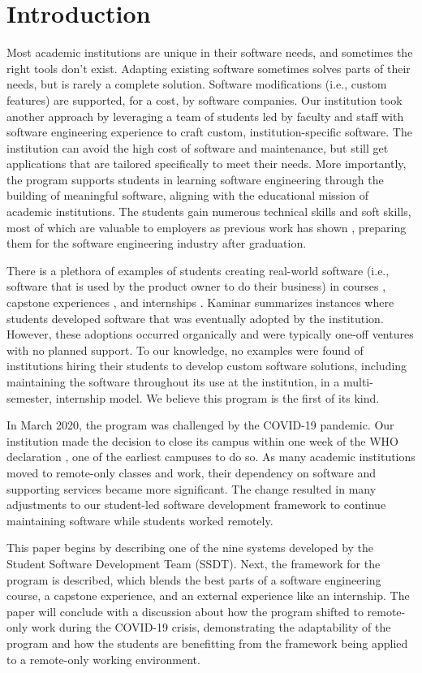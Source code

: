 \section{Introduction}

Most academic institutions are unique in their software needs, and sometimes the right tools don't exist. Adapting existing software sometimes solves parts of their needs, but is rarely a complete solution. Software modifications (i.e., custom features) are supported, for a cost, by software companies. Our institution took another approach by leveraging a team of students led by faculty and staff with software engineering experience to craft custom, institution-specific software. The institution can avoid the high cost of software and maintenance, but still get applications that are tailored specifically to meet their needs. More importantly, the program supports students in learning software engineering through the building of meaningful software, aligning with the educational mission of academic institutions. The students gain numerous technical skills and soft skills, most of which are valuable to employers \cite{lavy2013soft} as previous work has shown \cite{heggen2018hiring}, preparing them for the software engineering industry after graduation.

There is a plethora of examples of students creating real-world software (i.e., software that is used by the product owner to do their business) in courses \cite{tadayon2004software}, capstone experiences \cite{capstone}, and internships \cite{rochesterfirstundergradsoftwareteam}. Kaminar \cite{kaminer_2014} summarizes instances where students developed software that was eventually adopted by the institution. However, these adoptions occurred organically and were typically one-off ventures with no planned support. To our knowledge, no examples were found of institutions hiring their students to develop custom software solutions, including maintaining the software throughout its use at the institution, in a multi-semester, internship model. We believe this program is the first of its kind.

In March 2020, the program was challenged by the COVID-19 pandemic. Our institution made the decision to close its campus within one week of the WHO declaration \cite{covid}, one of the earliest campuses to do so. As many academic institutions moved to remote-only classes and work, their dependency on software and supporting services became more significant. The change resulted in many adjustments to our student-led software development framework to continue maintaining software while students worked remotely.

This paper begins by describing one of the nine systems developed by the Student Software Development Team (SSDT). Next, the framework for the program is described, which blends the best parts of a software engineering course, a capstone experience, and an external experience like an internship. The paper will conclude with a discussion about how the program shifted to remote-only work during the COVID-19 crisis, demonstrating the adaptability of the program and how the students are benefitting from the framework being applied to a remote-only working environment.
